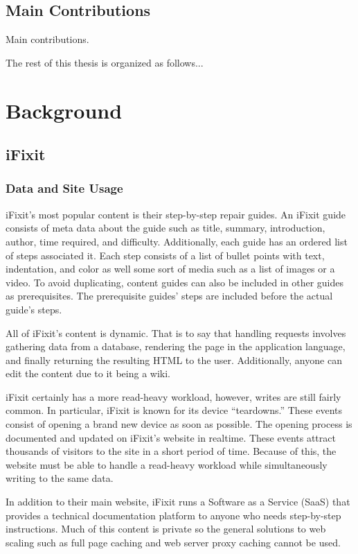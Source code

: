 \documentclass[12pt]{ucthesis}
\begin{document}

\section{Main Contributions}
Main contributions.

The rest of this thesis is organized as follows...


\chapter{Background}
\label{background}


\section{iFixit}
\subsection{Data and Site Usage}
iFixit's most popular content is their step-by-step repair guides.
An iFixit guide consists of meta data about the guide such as title, summary, introduction, author, time required, and difficulty.
Additionally, each guide has an ordered list of steps associated it.
Each step consists of a list of bullet points with text, indentation, and color as well some sort of media such as a list of images or a video.
To avoid duplicating, content guides can also be included in other guides as prerequisites.
The prerequisite guides' steps are included before the actual guide's steps.

All of iFixit's content is dynamic.
That is to say that handling requests involves gathering data from a database, rendering the page in the application language, and finally returning the resulting HTML to the user.
Additionally, anyone can edit the content due to it being a wiki.

iFixit certainly has a more read-heavy workload, however, writes are still fairly common.
In particular, iFixit is known for its device ``teardowns.''
These events consist of opening a brand new device as soon as possible.
The opening process is documented and updated on iFixit's website in realtime.
These events attract thousands of visitors to the site in a short period of time.
Because of this, the website must be able to handle a read-heavy workload while simultaneously writing to the same data.

In addition to their main website, iFixit runs a Software as a Service (SaaS) that provides a technical documentation platform to anyone who needs step-by-step instructions.
Much of this content is private so the general solutions to web scaling such as full page caching and web server proxy caching cannot be used.
\end{document}
